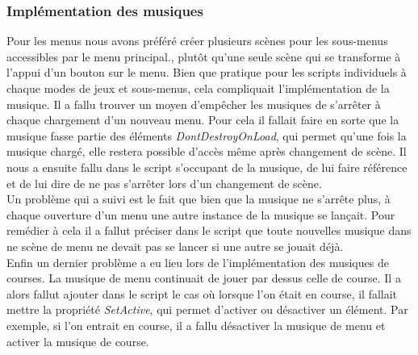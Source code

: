 \documentclass[a4paper,12pt]{article}
\begin{document}
            \subsubsection{Implémentation des musiques}
                Pour les menus nous avons préféré créer plusieurs scènes pour les sous-menus accessibles
                par le menu principal., plutôt qu'une seule scène qui se transforme à l'appui d'un 
                bouton sur le menu.
                Bien que pratique pour les scripts individuels à chaque modes de jeux et sous-menus,
                cela compliquait l'implémentation de la musique. Il a fallu trouver un moyen d'empêcher
                les musiques de s'arrêter à chaque chargement d'un nouveau menu. Pour cela il
                fallait faire en sorte que la musique fasse partie des éléments
                \textit{DontDestroyOnLoad}, qui permet qu'une fois la musique chargé, elle restera 
                possible d'accès
                même après changement de scène. Il nous a ensuite fallu dans le script s'occupant de la 
                musique, de lui faire référence et de lui dire de ne pas s'arrêter lors d'un changement
                de scène.\\
                Un problème qui a suivi est le fait que bien que la musique ne s'arrête plus, à chaque
                ouverture d'un menu une autre instance de la musique se lançait. Pour remédier à cela il
                a fallut préciser dans le script que toute nouvelles musique dans ne scène de menu ne
                devait pas se lancer si une autre se jouait déjà.\\
                Enfin un dernier problème a eu lieu lors de l'implémentation des musiques de courses. La
                musique de menu continuait de jouer par dessus celle de course. Il a alors fallut
                ajouter dans le script le cas où lorsque l'on était en course, il fallait mettre la 
                propriété \textit{SetActive}, qui permet d'activer ou désactiver un élément. Par 
                exemple, si l'on entrait en course, il a fallu désactiver la musique de menu et activer 
                la musique de course.
\end{document}
